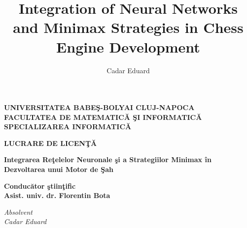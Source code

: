 \documentclass[12pt]{report}
\begin{document}
\title{Integration of Neural Networks and Minimax Strategies in Chess Engine Development}
\author{Cadar Eduard}
\maketitle

\begin{titlepage}
\begin{center}
    {\Large\textbf{
    UNIVERSITATEA BABE\c{S}-BOLYAI CLUJ-NAPOCA \\
    FACULTATEA DE MATEMATIC\u{A} \c{S}I INFORMATIC\u{A} \\
    SPECIALIZAREA INFORMATIC\u{A} \\
    }}
    \end{center}
    
    \vspace{10em}
    
    \begin{center}
    {\Huge\textbf{
    LUCRARE DE LICEN\c T\u A
    }}
    \end{center}
    
    \vspace{3em}
    
    \begin{center}
    {\huge\textbf{Integrarea Re\c{t}elelor Neuronale \c{s}i a Strategiilor Minimax \^{i}n Dezvoltarea unui Motor de \c{S}ah}}
    \end{center}
    
    \vspace{10em}
    
    \begin{flushleft}
    {\Large\textbf{
    Conduc\u{a}tor \c{s}tiin\c{t}ific \\ Asist. univ. dr. Florentin Bota
    }}
    \end{flushleft}
    
    \vspace{3em}
    
    \begin{flushright}
    {\Large\textit{
    Absolvent\\ Cadar Eduard
    }}
    \end{flushright}
    
    \vfill
    
    \begin{center}
    {\Large{\the\year}}
\end{center}
\end{titlepage}
\end{document}
